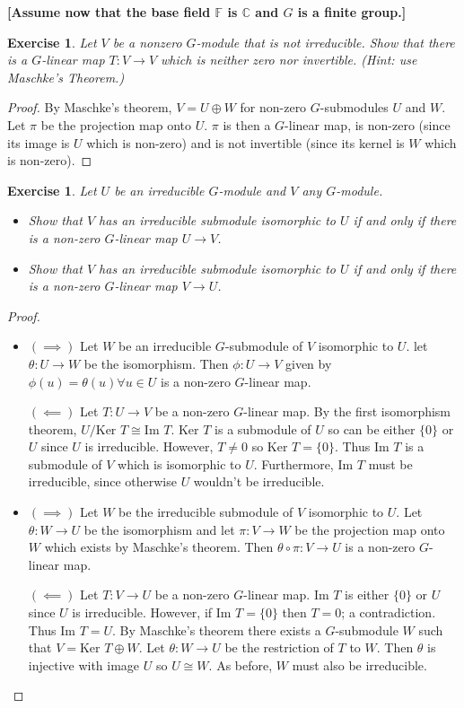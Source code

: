 \documentclass{article}
\newtheorem{exercise}[theorem]{Exercise}
\begin{document}
\textbf{[Assume now that the base field $\mathbb{F}$ is $\mathbb{C}$ and $G$ is a finite group.]}

\begin{exercise} Let $V$ be a nonzero $G$-module that is not irreducible. Show that there is a $G$-linear map $T : V \to V$ which is neither zero nor invertible. (\textit{Hint: use Maschke's Theorem.})
\end{exercise}

\begin{proof}
By Maschke's theorem, $V=U\oplus W$ for non-zero $G$-submodules $U$ and $W$. Let $\pi$ be the projection map onto $U$. $\pi$ is then a $G$-linear map, is non-zero (since its image is $U$ which is non-zero) and is not invertible (since its kernel is $W$ which is non-zero).
\end{proof}

\begin{exercise} Let $U$ be an irreducible $G$-module and $V$ any $G$-module.
\begin{itemize}
    \item[(a)] Show that $V$ has an irreducible submodule isomorphic to $U$ if and only if there is a non-zero $G$-linear map $U \to V$.
    \item[(b)] Show that $V$ has an irreducible submodule isomorphic to $U$ if and only if there is a non-zero $G$-linear map $V \to U$.
\end{itemize}
\end{exercise}
\begin{proof}
\begin{itemize}
    \item[(a)]$(\implies)$ Let $W$ be an irreducible $G$-submodule of $V$ isomorphic to $U$. let $\theta:U\to W$ be the isomorphism. Then $\phi:U\to V$ given by $\phi(u)=\theta(u)\forall u\in U$ is a non-zero $G$-linear map.

    $(\impliedby)$ Let $T:U\to V$ be a non-zero $G$-linear map. By the first isomorphism theorem, $U/\text{Ker }T\cong\text{Im }T$. $\text{Ker }T$ is a submodule of $U$ so can be either $\{0\}$ or $U$ since $U$ is irreducible. However, $T\neq 0$ so $\text{Ker }T=\{0\}$. Thus $\text{Im }T$ is a submodule of $V$ which is isomorphic to $U$. Furthermore, $\text{Im }T$ must be irreducible, since otherwise $U$ wouldn't be irreducible.
    \item[(b)] $(\implies)$ Let $W$ be the irreducible submodule of $V$ isomorphic to $U$. Let $\theta:W\to U$ be the isomorphism and let $\pi:V\to W$ be the projection map onto $W$ which exists by Maschke's theorem. Then $\theta\circ\pi:V\to U$ is a non-zero $G$-linear map.

    $(\impliedby)$ Let $T:V\to U$ be a non-zero $G$-linear map. $\text{Im }T$ is either $\{0\}$ or $U$ since $U$ is irreducible. However, if $\text{Im }T=\{0\}$ then $T=0$; a contradiction. Thus $\text{Im }T=U$. By Maschke's theorem there exists a $G$-submodule $W$ such that $V=\text{Ker }T\oplus W$. Let $\theta:W\to U$ be the restriction of $T$ to $W$. Then $\theta$ is injective with image $U$ so $U\cong W$. As before, $W$ must also be irreducible.
\end{itemize}
\end{proof}
\end{document}
